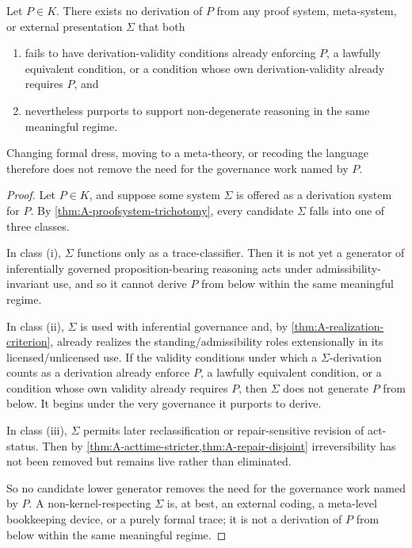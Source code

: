 \begin{theorem}
\label{thm:A-regime-invariant}
Let $P\in K$. There exists no derivation of $P$ from any proof system, meta-system, or external presentation $\Sigma$ that both
\begin{enumerate}[label=(\roman*), leftmargin=2.5em]
    \item fails to have derivation-validity conditions already enforcing $P$, a lawfully equivalent condition, or a condition whose own derivation-validity already requires $P$, and
    \item nevertheless purports to support non-degenerate reasoning in the same meaningful regime.
\end{enumerate}
Changing formal dress, moving to a meta-theory, or recoding the language therefore does not remove the need for the governance work named by $P$.
\end{theorem}

\begin{proof}
Let $P\in K$, and suppose some system $\Sigma$ is offered as a derivation system for $P$. By \cref{thm:A-proofsystem-trichotomy}, every candidate $\Sigma$ falls into one of three classes.

In class (i), $\Sigma$ functions only as a trace-classifier. Then it is not yet a generator of inferentially governed proposition-bearing reasoning acts under admissibility-invariant use, and so it cannot derive $P$ from below within the same meaningful regime.

In class (ii), $\Sigma$ is used with inferential governance and, by \cref{thm:A-realization-criterion}, already realizes the standing/admissibility roles extensionally in its licensed/unlicensed use. If the validity conditions under which a $\Sigma$-derivation counts as a derivation already enforce $P$, a lawfully equivalent condition, or a condition whose own validity already requires $P$, then $\Sigma$ does not generate $P$ from below. It begins under the very governance it purports to derive.

In class (iii), $\Sigma$ permits later reclassification or repair-sensitive revision of act-status. Then by \cref{thm:A-acttime-stricter,thm:A-repair-disjoint} irreversibility has not been removed but remains live rather than eliminated.

So no candidate lower generator removes the need for the governance work named by $P$. A non-kernel-respecting $\Sigma$ is, at best, an external coding, a meta-level bookkeeping device, or a purely formal trace; it is not a derivation of $P$ from below within the same meaningful regime.
\end{proof}

